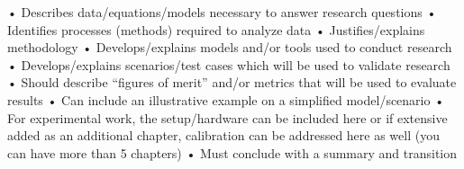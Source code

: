 
• Describes data/equations/models necessary to answer research questions
• Identifies processes (methods) required to analyze data
• Justifies/explains methodology
• Develops/explains models and/or tools used to conduct research
• Develops/explains scenarios/test cases which will be used to validate research
• Should describe “figures of merit” and/or metrics that will be used to evaluate results
• Can include an illustrative example on a simplified model/scenario
• For experimental work, the setup/hardware can be included here or if extensive added as an additional chapter, calibration can be addressed here as well (you can have more than 5 chapters)
• Must conclude with a summary and transition
